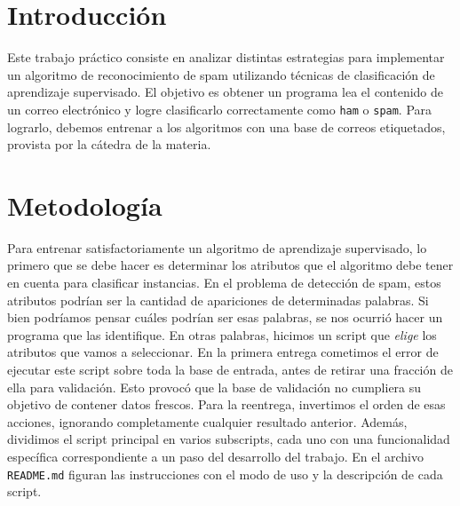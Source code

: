\documentclass[10pt, a4paper]{article}
\begin{document}
\fecha{\today}

\maketitle
\tableofcontents
\newpage

\section{Introducción}

Este trabajo práctico consiste en analizar distintas estrategias para implementar un algoritmo de reconocimiento de spam utilizando técnicas de clasificación de aprendizaje supervisado. El objetivo es obtener un programa lea el contenido de un correo electrónico y logre clasificarlo correctamente como \texttt{ham} o \texttt{spam}. Para lograrlo, debemos entrenar a los algoritmos con una base de correos etiquetados, provista por la cátedra de la materia.

\section{Metodología}

Para entrenar satisfactoriamente un algoritmo de aprendizaje supervisado, lo primero que se debe hacer es determinar los atributos que el algoritmo debe tener en cuenta para clasificar instancias. En el problema de detección de spam, estos atributos podrían ser la cantidad de apariciones de determinadas palabras. Si bien podríamos pensar cuáles podrían ser esas palabras, se nos ocurrió hacer un programa que las identifique. En otras palabras, hicimos un script que \textit{elige} los atributos que vamos a seleccionar. En la primera entrega cometimos el error de ejecutar este script sobre toda la base de entrada, antes de retirar una fracción de ella para validación. Esto provocó que la base de validación no cumpliera su objetivo de contener datos frescos.
Para la reentrega, invertimos el orden de esas acciones, ignorando completamente cualquier resultado anterior. Además, dividimos el script principal en varios subscripts, cada uno con una funcionalidad específica correspondiente a un paso del desarrollo del trabajo. En el archivo \texttt{README.md} figuran las instrucciones con el modo de uso y la descripción de cada script.
\end{document}
